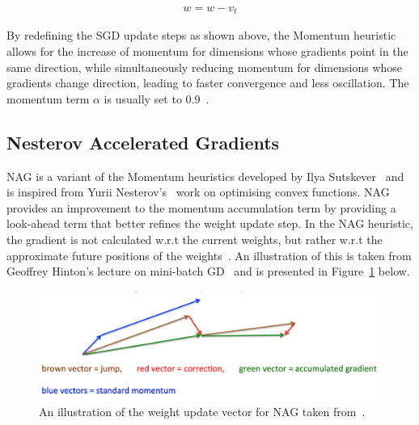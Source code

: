 \begin{equation}
      \label{eq:heuristics:gd:momentum_part_2}
      \begin{split}
            w = w - v_{t}
      \end{split}
\end{equation}

By redefining the \acs{SGD} update steps as shown above, the \acs{Momentum} heuristic allows for the increase of momentum for dimensions whose gradients point in the same direction, while simultaneously reducing momentum for dimensions whose gradients change direction, leading to faster convergence and less oscillation. The momentum term $\alpha$ is usually set to 0.9~\cite{ref:engelbrecht:2007}\cite{ref:ruder:2016}.


\subsection{Nesterov Accelerated Gradients}
\label{sec:heuristics:nag}

\Acl{NAG} is a variant of the \acs{Momentum} heuristics developed by Ilya Sutskever~\cite{ref:sutskever:2013-2} and is inspired from Yurii Nesterov's~\cite{ref:nesterov:1983} work on optimising convex functions. \ac{NAG} provides an improvement to the momentum accumulation term by providing a look-ahead term that better refines the weight update step. In the \acs{NAG} heuristic, the gradient is not calculated w.r.t the current weights, but rather w.r.t the approximate future positions of the weights~\cite{ref:ruder:2016}. An illustration of this is taken from Geoffrey Hinton's lecture on mini-batch \ac{GD}~\cite{ref:hinton:2012} and is presented in Figure~\ref{fig:heuristics:gd:nag} below.

\begin{figure}[htbp]
      \includegraphics[width=\textwidth]{images/nag.png}
      \caption{An illustration of the weight update vector for \ac{NAG} taken from~\cite{ref:hinton:2012}.}
      \label{fig:heuristics:gd:nag}
\end{figure}


